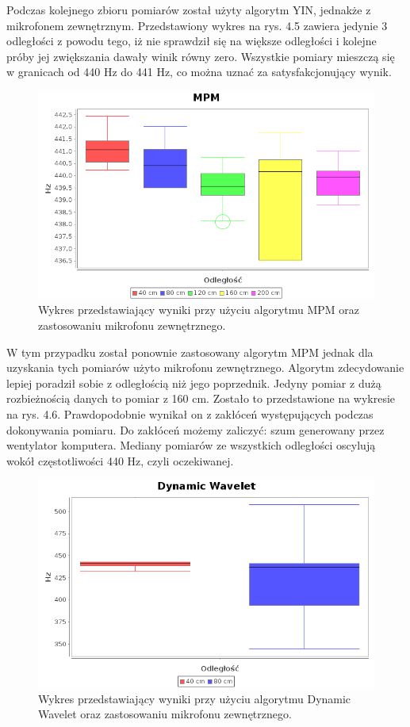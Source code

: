 \newpage
Podczas kolejnego zbioru pomiarów został użyty algorytm YIN, jednakże z mikrofonem zewnętrznym. Przedstawiony wykres na rys. 4.5 zawiera jedynie 3 odległości z powodu tego, iż nie sprawdził się na większe odległości i kolejne próby jej zwiększania dawały winik równy zero. Wszystkie pomiary mieszczą się w granicach od 440 Hz do 441 Hz, co można uznać za satysfakcjonujący wynik.


\begin{figure}[h!]
  \centering
  \includegraphics[width=0.5\linewidth]{rys/BoxPlots/MPM_mic_zew}
  \caption{Wykres przedstawiający wyniki przy użyciu algorytmu MPM oraz zastosowaniu mikrofonu zewnętrznego.}
  \label{fig:schemat}
\end{figure}


W tym przypadku został ponownie zastosowany algorytm MPM jednak dla uzyskania tych pomiarów użyto mikrofonu zewnętrznego. Algorytm zdecydowanie lepiej poradził sobie z odległością niż jego poprzednik. Jedyny pomiar z dużą rozbieżnością danych to pomiar z 160 cm. Zostało to przedstawione na wykresie na rys. 4.6. Prawdopodobnie wynikał on z zakłóceń występujących podczas dokonywania pomiaru. Do zakłóceń możemy zaliczyć: szum generowany przez wentylator komputera. Mediany pomiarów ze wszystkich odległości oscylują wokół częstotliwości 440 Hz, czyli oczekiwanej.



\begin{figure}[h!]
  \centering
  \includegraphics[width=0.5\linewidth]{rys/BoxPlots/Dynamic_mic_zew}
  \caption{Wykres przedstawiający wyniki przy użyciu algorytmu Dynamic Wavelet oraz zastosowaniu mikrofonu zewnętrznego.}
  \label{fig:schemat}
\end{figure}

